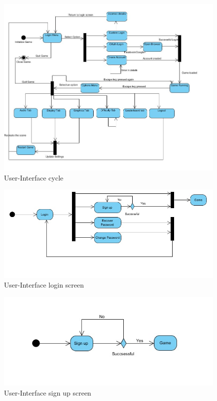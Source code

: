 \documentclass[letterpaper]{article}
\begin{document}
					\begin{figure}[H]
					\centering
					\includegraphics[width=180mm]{UML_Diagram/State/GUI_State.jpg}
					\caption{User-Interface cycle}
					\label{overflow}
					\end{figure}
					
					\begin{figure}[H]
					\centering
					\includegraphics[width=180mm]{UML_Diagram/Activity/login.jpg}
					\caption{User-Interface login screen}
					\label{overflow}
					\end{figure}
					
					\begin{figure}[H]
					\centering
					\includegraphics[width=180mm]{UML_Diagram/Activity/signup.jpg}
					\caption{User-Interface sign up screen}
					\label{overflow}
					\end{figure}
					
\end{document}
